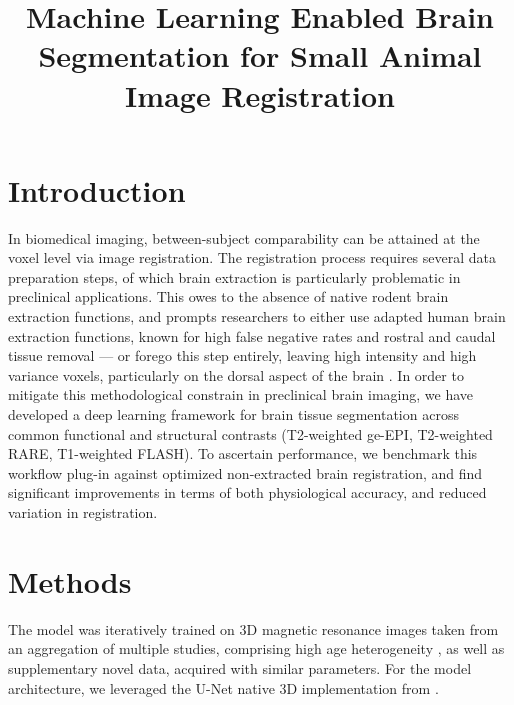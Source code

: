 \documentclass[11pt, english]{article}
\title{Machine Learning Enabled Brain Segmentation for Small Animal Image Registration}
\date{}
\begin{document}
    \maketitle


    \section{Introduction}
    In biomedical imaging, between-subject comparability can be attained at the voxel level via image registration.
    The registration process requires several data preparation steps, of which brain extraction is particularly problematic in preclinical applications.
    This owes to the absence of native rodent brain extraction functions, and prompts researchers to either use adapted human brain extraction functions, known for high false negative rates and rostral and caudal tissue removal --- or forego this step entirely, leaving high intensity and high variance voxels, particularly on the dorsal aspect of the brain \cite{ioanas_optimized_2019}.
    In order to mitigate this methodological constrain in preclinical brain imaging, we have developed a deep learning framework for brain tissue segmentation across common functional and structural contrasts (T2-weighted ge-EPI, T2-weighted RARE, T1-weighted FLASH).
    To ascertain performance, we benchmark this workflow plug-in against optimized non-extracted brain registration, and find significant improvements in terms of both physiological accuracy, and reduced variation in registration.

    \section{Methods}
    The model was iteratively trained on 3D magnetic resonance images taken from an aggregation of multiple studies, comprising high age heterogeneity \citet{ioanas_whole-brain_nodate,imperfect_datasets}, as well as supplementary novel data, acquired with similar parameters.
    For the model architecture, we leveraged the U-Net \citep{ronneberger_u-net:_2015} native 3D implementation from \citet{oktay_ozan-oktayattention-gated-networks_2020}.
\end{document}
